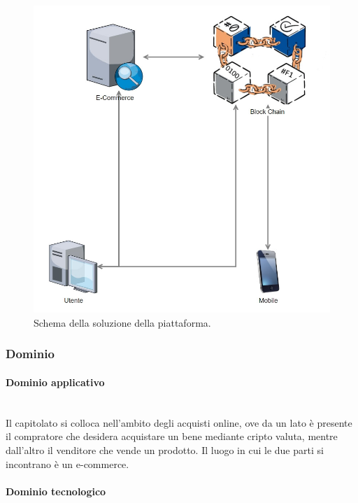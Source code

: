 \documentclass[11pt]{article}
\begin{document}
    \begin{figure}[h!]
        \centering
        \includegraphics[scale=0.4]{Res/SyncLab.png}
        \caption{Schema della soluzione della piattaforma.}
        \label{SyncLab}
    \end{figure}
    
    \subsubsection{Dominio}
        \paragraph{Dominio applicativo}~\\
        
        \noindent
        Il capitolato si colloca nell'ambito degli acquisti online, ove da un lato è presente il compratore che desidera acquistare un
        bene mediante cripto valuta, mentre dall'altro il venditore che vende un prodotto.
        Il luogo in cui le due parti si incontrano è un e-commerce.
        
        \paragraph{Dominio tecnologico}~\\
        
\end{document}
